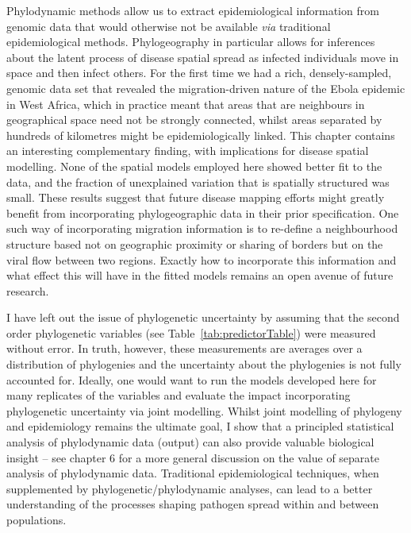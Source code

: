 Phylodynamic methods allow us to extract epidemiological information from genomic data that would otherwise not be available \textit{via} traditional epidemiological methods.
Phylogeography in particular allows for inferences about the latent process of disease spatial spread as infected individuals move in space and then infect others.
For the first time we had a rich, densely-sampled, genomic data set that revealed the migration-driven nature of the Ebola epidemic in West Africa, which in practice meant that areas that are neighbours in geographical space need not be strongly connected, whilst areas separated by hundreds of kilometres might be epidemiologically linked.
This chapter contains an interesting complementary finding, with implications for disease spatial modelling.
None of the spatial models employed here showed better fit to the data, and the fraction of unexplained variation that is spatially structured was small.
These results suggest that future disease mapping efforts might greatly benefit from incorporating phylogeographic data in their prior specification.
One such way of incorporating migration information is to re-define a neighbourhood structure based not on geographic proximity or sharing of borders but on the viral flow between two regions.
Exactly how to incorporate this information and what effect this will have in the fitted models remains an open avenue of future research.

I have left out the issue of phylogenetic uncertainty by assuming that the second order phylogenetic variables (see Table~\ref{tab:predictorTable}) were measured without error.
In truth, however, these measurements are averages over a distribution of phylogenies and the uncertainty about the phylogenies is not fully accounted for.
Ideally, one would want to run the models developed here for many replicates of the variables and evaluate the impact incorporating phylogenetic uncertainty via joint modelling.
Whilst joint modelling of phylogeny and epidemiology remains the ultimate goal, I show that a principled statistical analysis of phylodynamic data (output) can also provide valuable biological insight -- see chapter 6 for a more general discussion on the value of separate analysis of phylodynamic data.
Traditional epidemiological techniques, when supplemented by phylogenetic/phylodynamic analyses, can lead to a better understanding of the processes shaping pathogen spread within and between populations.

